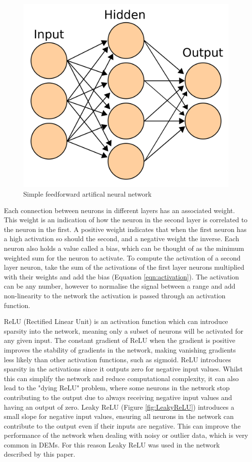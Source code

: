 \documentclass[twocolumn]{article}
\begin{document}
\begin{figure}[htbp]
\centering
\includegraphics[width=.9\linewidth]{images/neural_network.png}
\caption{\label{fig:neural_network}Simple feedforward artifical neural network\autocite{ArtificialNeuralNetwork2023}}
\end{figure}

Each connection between neurons in different layers has an associated weight.
This weight is an indication of how the neuron in the second layer is correlated to the neuron in the first.
A positive weight indicates that when the first neuron has a high activation so should the second, and a negative weight the inverse.
Each neuron also holds a value called a bias, which can be thought of as the minimum weighted sum for the neuron to activate.
To compute the activation of a second layer neuron, take the sum of the activations of the first layer neurons multiplied with their weights and add the bias (Equation \ref{eqn:activation}).
The activation can be any number, however to normalise the signal between a range and add non-linearity to the network the activation is passed through an activation function.

ReLU (Rectified Linear Unit) is an activation function which can introduce sparsity into the network, meaning only a subset of neurons will be activated for any given input.
The constant gradient of ReLU when the gradient is positive improves the stability of gradients in the network, making vanishing gradients less likely than other activation functions, such as sigmoid.
ReLU introduces sparsity in the activations since it outputs zero for negative input values.
Whilst this can simplify the network and reduce computational complexity, it can also lead to the "dying ReLU" problem, where some neurons in the network stop contributing to the output due to always receiving negative input values and having an output of zero.
Leaky ReLU (Figure \ref{fig:LeakyReLU}) introduces a small slope for negative input values, ensuring all neurons in the network can contribute to the output even if their inputs are negative.
This can improve the performance of the network when dealing with noisy or outlier data, which is very common in DEMs.
For this reason Leaky ReLU was used in the network described by this paper.
\end{document}
